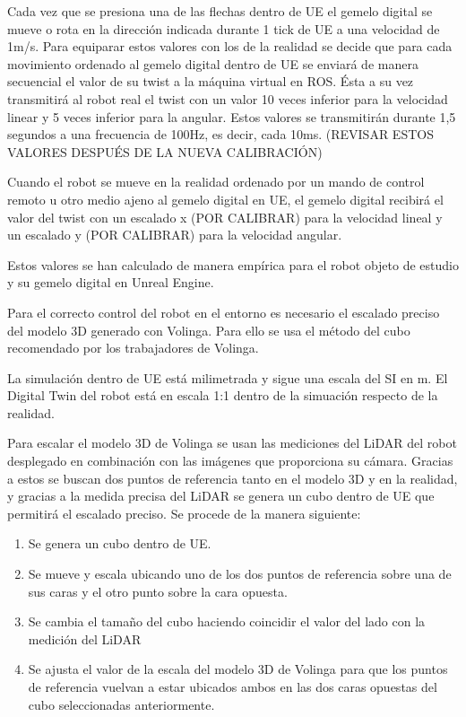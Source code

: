 \documentclass[a4paper, 12pt, spanish, twoside]{article}
\begin{document}
Cada vez que se presiona una de las flechas dentro de UE el gemelo digital se mueve o rota en la dirección indicada durante 1 tick de UE a una velocidad de 1m/s. Para equiparar estos valores con los de la realidad se decide que para cada movimiento ordenado al gemelo digital dentro de UE se enviará de manera secuencial el valor de su twist a la máquina virtual en ROS. Ésta a su vez transmitirá al robot real el twist con un valor 10 veces inferior para la velocidad linear y 5 veces inferior para la angular. Estos valores se transmitirán durante 1,5 segundos a una frecuencia de 100Hz, es decir, cada 10ms. (REVISAR ESTOS VALORES DESPUÉS DE LA NUEVA CALIBRACIÓN) 

Cuando el robot se mueve en la realidad ordenado por un mando de control remoto u otro medio ajeno al gemelo digital en UE, el gemelo digital recibirá el valor del twist con un escalado x (POR CALIBRAR) para la velocidad lineal y un escalado y (POR CALIBRAR) para la velocidad angular. 

Estos valores se han calculado de manera empírica para el robot objeto de estudio y su gemelo digital en Unreal Engine. 


Para el correcto control del robot en el entorno es necesario el escalado preciso del modelo 3D generado con Volinga. Para ello se usa el método del cubo recomendado por los trabajadores de Volinga. 

La simulación dentro de UE está milimetrada y sigue una escala del SI en m. El Digital Twin del robot está en escala 1:1 dentro de la simuación respecto de la realidad.  

Para escalar el modelo 3D de Volinga se usan las mediciones del LiDAR del robot desplegado en combinación con las imágenes que proporciona su cámara. Gracias a estos se buscan dos puntos de referencia tanto en el modelo 3D y en la realidad, y gracias a la medida precisa del LiDAR se genera un cubo dentro de UE que permitirá el escalado preciso. Se procede de la manera siguiente: 

\begin{enumerate} 

\item Se genera un cubo dentro de UE. 

\item Se mueve y escala ubicando uno de los dos puntos de referencia sobre una de sus caras y el otro punto sobre la cara opuesta. 

\item Se cambia el tamaño del cubo haciendo coincidir el valor del lado con la medición del LiDAR 

\item Se ajusta el valor de la escala del modelo 3D de Volinga para que los puntos de referencia vuelvan a estar ubicados ambos en las dos caras opuestas del cubo seleccionadas anteriormente. 

\end{enumerate} 
\end{document}
